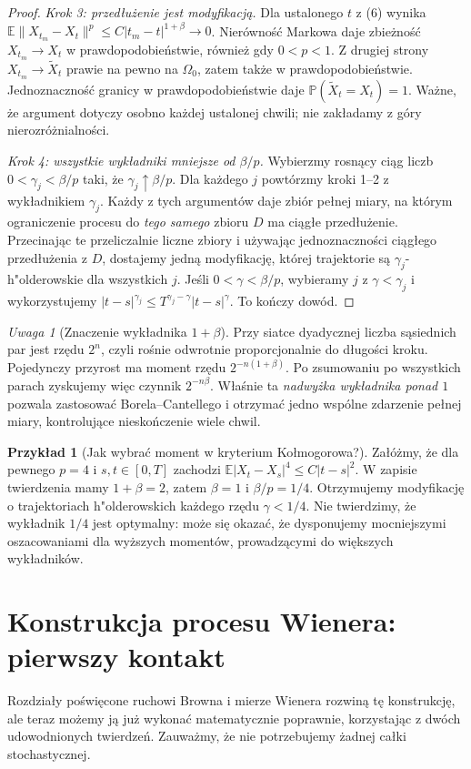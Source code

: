 \documentclass[11pt,a4paper,oneside]{report}
\numberwithin{equation}{chapter}
\theoremstyle{plain}
\theoremstyle{definition}
\newtheorem{przyklad}{Przykład}[chapter]
\theoremstyle{remark}
\newtheorem{uwaga}{Uwaga}[chapter]
\newcommand{\Prob}{\mathbb{P}}
\newcommand{\E}{\mathbb{E}}
\newcommand{\norm}[1]{\lVert #1\rVert}
\begin{document}
\begin{proof}
\emph{Krok 3: przedłużenie jest modyfikacją.}
Dla ustalonego $t$ z (6) wynika
$\E\norm{X_{t_m}-X_t}^{p}\le C|t_m-t|^{1+\beta}\to0$.
Nierówność Markowa daje zbieżność $X_{t_m}\to X_t$
w prawdopodobieństwie, również gdy $0<p<1$.
Z drugiej strony $X_{t_m}\to\widetilde X_t$
prawie na pewno na $\Omega_0$, zatem także w
prawdopodobieństwie. Jednoznaczność granicy w
prawdopodobieństwie daje $\Prob(\widetilde X_t=X_t)=1$.
Ważne, że argument dotyczy osobno każdej ustalonej chwili;
nie zakładamy z góry nierozróżnialności.

\emph{Krok 4: wszystkie wykładniki mniejsze od $\beta/p$.}
Wybierzmy rosnący ciąg liczb
$0<\gamma_j<\beta/p$ taki, że
$\gamma_j\uparrow\beta/p$. Dla każdego $j$
powtórzmy kroki 1--2 z wykładnikiem $\gamma_j$.
Każdy z tych argumentów daje zbiór pełnej miary,
na którym ograniczenie procesu do \emph{tego samego}
zbioru $D$ ma ciągłe przedłużenie.
Przecinając te przeliczalnie liczne zbiory i używając
jednoznaczności ciągłego przedłużenia z $D$,
dostajemy jedną modyfikację, której trajektorie są
$\gamma_j$-h"olderowskie dla wszystkich $j$.
Jeśli $0<\gamma<\beta/p$, wybieramy $j$ z
$\gamma<\gamma_j$ i wykorzystujemy
$|t-s|^{\gamma_j}\le T^{\gamma_j-\gamma}|t-s|^\gamma$.
To kończy dowód.
\end{proof}

\begin{uwaga}[Znaczenie wykładnika $1+\beta$]
Przy siatce dyadycznej liczba sąsiednich par jest rzędu
$2^n$, czyli rośnie odwrotnie proporcjonalnie do długości
kroku. Pojedynczy przyrost ma moment rzędu
$2^{-n(1+\beta)}$. Po zsumowaniu po wszystkich parach
zyskujemy więc czynnik $2^{-n\beta}$.
Właśnie ta \emph{nadwyżka wykładnika ponad $1$}
pozwala zastosować Borela--Cantellego i otrzymać
jedno wspólne zdarzenie pełnej miary, kontrolujące
nieskończenie wiele chwil.
\end{uwaga}

\begin{przyklad}[Jak wybrać moment w kryterium Kołmogorowa?]
Załóżmy, że dla pewnego $p=4$ i $s,t\in[0,T]$
zachodzi $\E|X_t-X_s|^4\le C|t-s|^2$.
W zapisie twierdzenia mamy $1+\beta=2$, zatem $\beta=1$
i $\beta/p=1/4$. Otrzymujemy modyfikację o trajektoriach
h"olderowskich każdego rzędu $\gamma<1/4$.
Nie twierdzimy, że wykładnik $1/4$ jest optymalny:
może się okazać, że dysponujemy mocniejszymi
oszacowaniami dla wyższych momentów, prowadzącymi do
większych wykładników.
\end{przyklad}

\section{Konstrukcja procesu Wienera: pierwszy kontakt}
Rozdziały poświęcone ruchowi Browna i mierze Wienera
rozwiną tę konstrukcję, ale teraz możemy ją już wykonać
matematycznie poprawnie, korzystając z dwóch udowodnionych
twierdzeń. Zauważmy, że nie potrzebujemy żadnej całki
stochastycznej.
\end{document}
